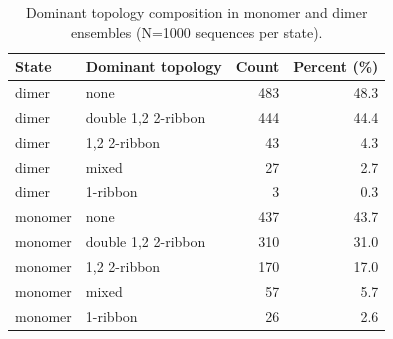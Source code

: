 \begin{table}[ht]
\centering
\caption{Dominant topology composition in monomer and dimer ensembles (N=1000 sequences per state).}
\label{tab:dominant-composition}
\begin{tabular}{llrr}
\toprule
State & Dominant topology & Count & Percent (\%) \\
\midrule
dimer & none & 483 & 48.3 \\
dimer & double 1,2 2-ribbon & 444 & 44.4 \\
dimer & 1,2 2-ribbon & 43 & 4.3 \\
dimer & mixed & 27 & 2.7 \\
dimer & 1-ribbon & 3 & 0.3 \\
monomer & none & 437 & 43.7 \\
monomer & double 1,2 2-ribbon & 310 & 31.0 \\
monomer & 1,2 2-ribbon & 170 & 17.0 \\
monomer & mixed & 57 & 5.7 \\
monomer & 1-ribbon & 26 & 2.6 \\
\bottomrule
\end{tabular}
\end{table}
